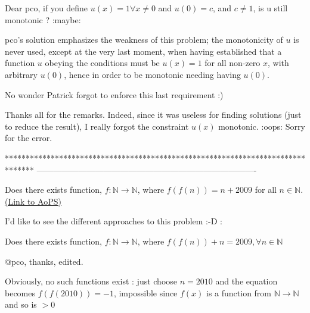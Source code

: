 \begin{solution}
	Dear pco, if you define $u(x)=1 \forall x\neq 0$ and $u(0)=c$, and $c\neq 1$, is u still monotonic ?  :maybe:
\end{solution}



\begin{solution}
	pco's solution emphasizes the weakness of this problem; the monotonicity of $u$ is never used, except at the very last moment, when having established that a function $u$ obeying the conditions must be $u(x)=1$ for all non-zero $x$, with arbitrary $u(0)$, hence in order to be monotonic needing having $u(0)$.

No wonder Patrick forgot to enforce this last requirement  :)
\end{solution}



\begin{solution}
	Thanks all for the remarks.
Indeed, since it was useless for finding solutions (just to reduce the result),  I really forgot the constraint $u(x)$ monotonic. :oops:
Sorry for the error.
\end{solution}
*******************************************************************************
-------------------------------------------------------------------------------

\begin{problem}
	Does there exists function, $f:\mathbb{N} \longrightarrow \mathbb{N}$, where $f(f(n))=n+2009$ for all $n \in \mathbb{N}$.
	\flushright \href{https://artofproblemsolving.com/community/c6h403771}{(Link to AoPS)}
\end{problem}



\begin{solution}
	\begin{tcolorbox}I'd like to see the different approaches to this problem :-D : 

Does there exists function, $f:\mathbb{N} \longrightarrow \mathbb{N}$, where $f(f(n))+n=2009 ,\forall n \in \mathbb{N}$

@pco, thanks, edited.\end{tcolorbox}

Obviously, no such functions exist : just choose $n=2010$ and the equation becomes $f(f(2010))=-1$, impossible since $f(x)$ is a function from $\mathbb N\to\mathbb N$ and so is $>0$
\end{solution}




